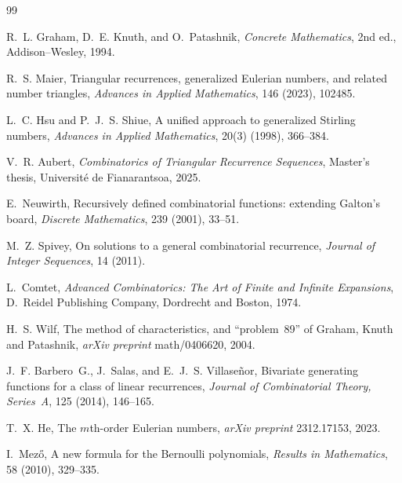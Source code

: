 \documentclass[12pt,a4paper]{article}
\theoremstyle{definition} %
\theoremstyle{remark}
\theoremstyle{examples}
\begin{document}
	
	\begin{thebibliography}{99}
		
		R.~L. Graham, D.~E. Knuth, and O.~Patashnik,
		\newblock \emph{Concrete Mathematics},
		\newblock 2nd ed., Addison--Wesley, 1994.
		
		R.~S. Maier,
		\newblock Triangular recurrences, generalized Eulerian numbers, and related number triangles,
		\newblock \emph{Advances in Applied Mathematics}, 146 (2023), 102485.
		
		L.~C. Hsu and P.~J.~S. Shiue,
		\newblock A unified approach to generalized Stirling numbers,
		\newblock \emph{Advances in Applied Mathematics}, 20(3) (1998), 366--384.
		
		V.~R. Aubert,
		\newblock \emph{Combinatorics of Triangular Recurrence Sequences},
		\newblock Master's thesis, Université de Fianarantsoa, 2025.
		
		E.~Neuwirth,
		\newblock Recursively defined combinatorial functions: extending Galton's board,
		\newblock \emph{Discrete Mathematics}, 239 (2001), 33--51.
		
		M.~Z. Spivey,
		\newblock On solutions to a general combinatorial recurrence,
		\newblock \emph{Journal of Integer Sequences}, 14 (2011).
		
		L.~Comtet,
		\newblock \emph{Advanced Combinatorics: The Art of Finite and Infinite Expansions},
		\newblock D.~Reidel Publishing Company, Dordrecht and Boston, 1974.
		
		H.~S. Wilf,
		\newblock The method of characteristics, and ``problem~89'' of Graham, Knuth and Patashnik,
		\newblock \emph{arXiv preprint} math/0406620, 2004.
		
		J.~F. Barbero~G., J.~Salas, and E.~J.~S. Villase\~nor,
		\newblock Bivariate generating functions for a class of linear recurrences,
		\newblock \emph{Journal of Combinatorial Theory, Series~A}, 125 (2014), 146--165.
		
		T.~X. He,
		\newblock The $m$th-order Eulerian numbers,
		\newblock \emph{arXiv preprint} 2312.17153, 2023.
		
	
		
	
		
		I.~Mez\H{o},
		\newblock A new formula for the Bernoulli polynomials,
		\newblock \emph{Results in Mathematics}, 58 (2010), 329--335.
		

\end{thebibliography}
\end{document}

